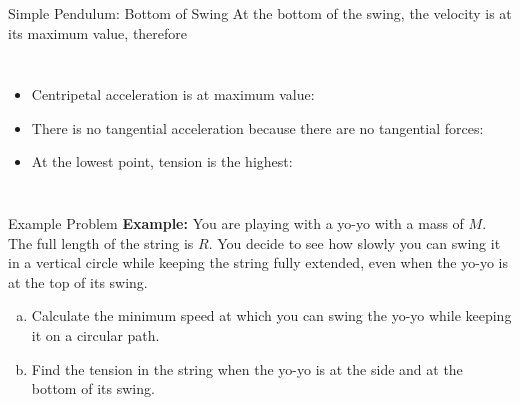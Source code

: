 \documentclass[12pt,compress,aspectratio=169]{beamer}
\begin{document}
\begin{frame}{Simple Pendulum: Bottom of Swing}
  At the bottom of the swing, the velocity is at its maximum value,
  therefore
  \vspace{.1in}\begin{columns}

    \begin{itemize}
    \item Centripetal acceleration is at maximum value:

    \item There is no tangential acceleration because there are no tangential
      forces:

    \item At the lowest point, tension is the highest:

    \end{itemize}
  \end{columns}
\end{frame}



\begin{frame}{Example Problem}
  \textbf{Example:} You are playing with a yo-yo with a mass of $M$. The
  full length of the string is $R$. You decide to see how slowly you can swing
  it in a vertical circle while keeping the string fully extended, even when
  the yo-yo is at the top of its swing.
  \begin{enumerate}[a.]
  \item Calculate the minimum speed at which you can swing the yo-yo while
    keeping it on a circular path.
  \item Find the tension in the string when the yo-yo is at the side and at the
    bottom of its swing. 
  \end{enumerate}
\end{frame}
\end{document}

